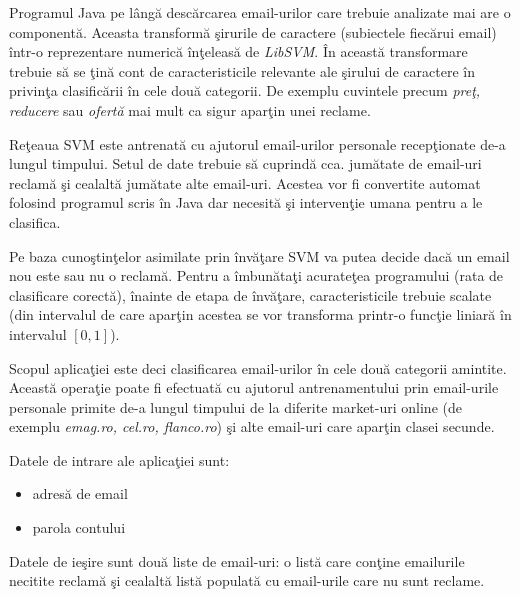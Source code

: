 \documentclass[a4paper,12pt]{report}
\begin{document}
  \par
  Programul Java pe l\^ang\u a desc\u arcarea email-urilor care trebuie analizate mai are o component\u a. Aceasta
  transform\u a \c sirurile de caractere (subiectele fiec\u arui email) \^intr-o reprezentare numeric\u a \^in\c teleas\u a
  de \textit{LibSVM}. \^In aceast\u a transformare trebuie s\u a se \c tin\u a cont de caracteristicile relevante ale 
  \c sirului de caractere \^in privin\c ta clasific\u arii \^in cele dou\u a categorii. De exemplu cuvintele precum 
  \textit{pre\c t, reducere} sau \textit{ofert\u a} mai mult ca sigur apar\c tin unei reclame.
  
  \par
  Re\c teaua SVM este antrenat\u a cu ajutorul email-urilor personale recep\c tionate de-a lungul timpului. Setul de date
  trebuie s\u a cuprind\u a cca. jum\u atate de email-uri reclam\u a \c si cealalt\u a jum\u atate alte email-uri. Acestea
  vor fi convertite automat folosind programul scris \^in Java dar necesit\u a \c si interven\c tie 
  umana pentru a le clasifica.
  
  \par
  Pe baza cuno\c stin\c telor asimilate prin \^inv\u a\c tare SVM va putea decide dac\u a un email nou este sau nu
  o reclam\u a. Pentru a \^imbun\u ata\c ti acurate\c tea programului (rata de clasificare corect\u a), \^inainte de
  etapa de \^inv\u a\c tare, caracteristicile trebuie scalate (din intervalul de care apar\c tin acestea se vor transforma
  printr-o func\c tie liniar\u a \^in intervalul $[0,1]$).
  
  \par
  Scopul aplica\c tiei este deci clasificarea email-urilor \^in cele dou\u a categorii amintite. Aceast\u a opera\c tie
  poate fi efectuat\u a cu ajutorul antrenamentului prin email-urile personale primite de-a lungul timpului de la 
  diferite market-uri online (de exemplu \textit{emag.ro, cel.ro, flanco.ro}) \c si alte email-uri care apar\c tin 
  clasei secunde.
  
  \par
  Datele de intrare ale aplica\c tiei sunt:
  
  \begin{itemize}
    \item adres\u a de email
    \item parola contului
  \end{itemize}
  
  Datele de ie\c sire sunt dou\u a liste de email-uri: o list\u a care con\c tine emailurile necitite reclam\u a \c si 
  cealalt\u a list\u a populat\u a cu email-urile care nu sunt reclame.
  
\end{document}
